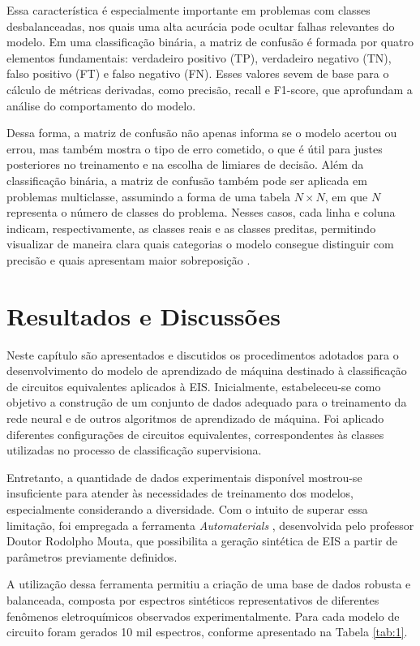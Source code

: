 Essa característica
é especialmente importante em problemas com classes desbalanceadas, nos quais uma alta
acurácia pode ocultar falhas relevantes do modelo. Em uma classificação binária, a matriz de
confusão é formada por quatro elementos fundamentais: verdadeiro positivo (TP), verdadeiro
negativo (TN), falso positivo (FT) e falso negativo (FN). Esses valores sevem de base para o
cálculo de métricas derivadas, como precisão, recall e F1-score, que aprofundam a análise do
comportamento do modelo.

Dessa forma, a matriz de confusão não apenas informa se o modelo
acertou ou errou, mas também mostra o tipo de erro cometido, o que é útil para justes posteriores
no treinamento e na escolha de limiares de decisão. Além da classificação binária, a matriz de
confusão também pode ser aplicada em problemas multiclasse, assumindo a forma de uma
tabela $N\times N$, em que $N$ representa o número de classes do problema. Nesses casos, cada linha
e coluna indicam, respectivamente, as classes reais e as classes preditas, permitindo visualizar
de maneira clara quais categorias o modelo consegue distinguir com precisão e quais
apresentam maior sobreposição \cite{meyerbaese2014foundations}.

\chapter{Resultados e Discussões}
Neste capítulo são apresentados e discutidos os procedimentos adotados para o
desenvolvimento do modelo de aprendizado de máquina destinado à classificação de circuitos
equivalentes aplicados à EIS.
Inicialmente, estabeleceu-se como objetivo a construção de um conjunto de dados
adequado para o treinamento da rede neural e de outros algoritmos de aprendizado de máquina.
Foi aplicado diferentes configurações de circuitos equivalentes, correspondentes às classes
utilizadas no processo de classificação supervisiona.

Entretanto, a quantidade de dados
experimentais disponível mostrou-se insuficiente para atender às necessidades de treinamento
dos modelos, especialmente considerando a diversidade. Com o intuito de superar essa
limitação, foi empregada a ferramenta \textit{Automaterials} \cite{mouta2025automaterials}, desenvolvida pelo professor Doutor Rodolpho Mouta, que possibilita a
geração sintética de EIS a partir de parâmetros previamente definidos.

A utilização dessa
ferramenta permitiu a criação de uma base de dados robusta e balanceada, composta por
espectros sintéticos representativos de diferentes fenômenos eletroquímicos observados
experimentalmente. Para cada modelo de circuito foram gerados 10 mil espectros, conforme
apresentado na Tabela \ref{tab:1}.

